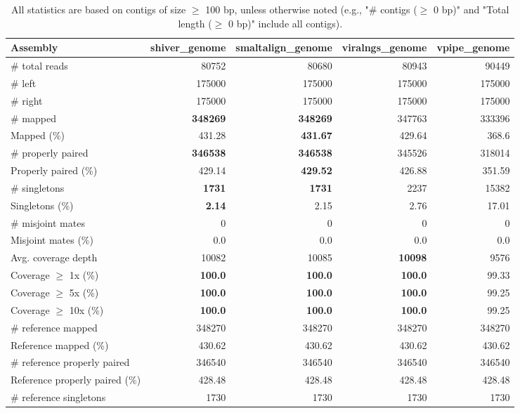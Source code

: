 \documentclass[12pt,a4paper]{article}
\begin{document}
\begin{table}[ht]
\begin{center}
\caption{All statistics are based on contigs of size $\geq$ 100 bp, unless otherwise noted (e.g., "\# contigs ($\geq$ 0 bp)" and "Total length ($\geq$ 0 bp)" include all contigs).}
\begin{tabular}{|l*{4}{|r}|}
\hline
Assembly & shiver\_genome & smaltalign\_genome & viralngs\_genome & vpipe\_genome \\ \hline
\# total reads & 80752 & 80680 & 80943 & 90449 \\ \hline
\# left & 175000 & 175000 & 175000 & 175000 \\ \hline
\# right & 175000 & 175000 & 175000 & 175000 \\ \hline
\# mapped & {\bf 348269} & {\bf 348269} & 347763 & 333396 \\ \hline
Mapped (\%) & 431.28 & {\bf 431.67} & 429.64 & 368.6 \\ \hline
\# properly paired & {\bf 346538} & {\bf 346538} & 345526 & 318014 \\ \hline
Properly paired (\%) & 429.14 & {\bf 429.52} & 426.88 & 351.59 \\ \hline
\# singletons & {\bf 1731} & {\bf 1731} & 2237 & 15382 \\ \hline
Singletons (\%) & {\bf 2.14} & 2.15 & 2.76 & 17.01 \\ \hline
\# misjoint mates & 0 & 0 & 0 & 0 \\ \hline
Misjoint mates (\%) & 0.0 & 0.0 & 0.0 & 0.0 \\ \hline
Avg. coverage depth & 10082 & 10085 & {\bf 10098} & 9576 \\ \hline
Coverage $\geq$ 1x (\%) & {\bf 100.0} & {\bf 100.0} & {\bf 100.0} & 99.33 \\ \hline
Coverage $\geq$ 5x (\%) & {\bf 100.0} & {\bf 100.0} & {\bf 100.0} & 99.25 \\ \hline
Coverage $\geq$ 10x (\%) & {\bf 100.0} & {\bf 100.0} & {\bf 100.0} & 99.25 \\ \hline
\# reference mapped & 348270 & 348270 & 348270 & 348270 \\ \hline
Reference mapped (\%) & 430.62 & 430.62 & 430.62 & 430.62 \\ \hline
\# reference properly paired & 346540 & 346540 & 346540 & 346540 \\ \hline
Reference properly paired (\%) & 428.48 & 428.48 & 428.48 & 428.48 \\ \hline
\# reference singletons & 1730 & 1730 & 1730 & 1730 \\ \hline

\end{tabular}
\end{center}
\end{table}
\end{document}
